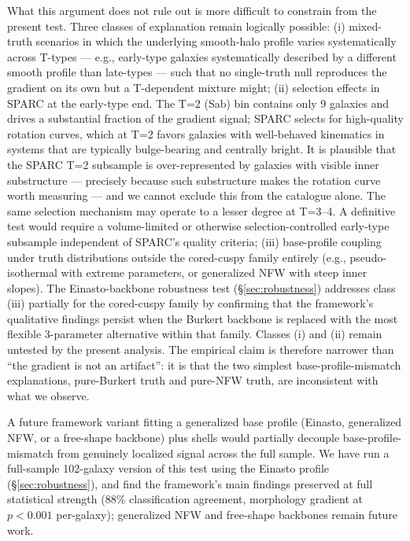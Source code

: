 What this argument does not rule out is more difficult to constrain from the present test. Three classes of explanation remain logically possible: (i) mixed-truth scenarios in which the underlying smooth-halo profile varies systematically across T-types --- e.g., early-type galaxies systematically described by a different smooth profile than late-types --- such that no single-truth null reproduces the gradient on its own but a T-dependent mixture might; (ii) selection effects in SPARC at the early-type end. The T=2 (Sab) bin contains only 9 galaxies and drives a substantial fraction of the gradient signal; SPARC selects for high-quality rotation curves, which at T=2 favors galaxies with well-behaved kinematics in systems that are typically bulge-bearing and centrally bright. It is plausible that the SPARC T=2 subsample is over-represented by galaxies with visible inner substructure --- precisely because such substructure makes the rotation curve worth measuring --- and we cannot exclude this from the catalogue alone. The same selection mechanism may operate to a lesser degree at T=3--4. A definitive test would require a volume-limited or otherwise selection-controlled early-type subsample independent of SPARC's quality criteria; (iii) base-profile coupling under truth distributions outside the cored-cuspy family entirely (e.g., pseudo-isothermal with extreme parameters, or generalized NFW with steep inner slopes). The Einasto-backbone robustness test (\S\ref{sec:robustness}) addresses class (iii) partially for the cored-cuspy family by confirming that the framework's qualitative findings persist when the Burkert backbone is replaced with the most flexible 3-parameter alternative within that family. Classes (i) and (ii) remain untested by the present analysis. The empirical claim is therefore narrower than ``the gradient is not an artifact'': it is that the two simplest base-profile-mismatch explanations, pure-Burkert truth and pure-NFW truth, are inconsistent with what we observe.

A future framework variant fitting a generalized base profile (Einasto, generalized NFW, or a free-shape backbone) plus shells would partially decouple base-profile-mismatch from genuinely localized signal across the full sample. We have run a full-sample 102-galaxy version of this test using the Einasto profile (\S\ref{sec:robustness}), and find the framework's main findings preserved at full statistical strength (88\% classification agreement, morphology gradient at $p < 0.001$ per-galaxy); generalized NFW and free-shape backbones remain future work.

